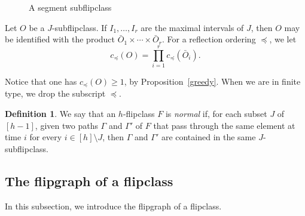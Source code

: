 \documentclass[12pt,reqno]{amsart}
\theoremstyle{plain}
\theoremstyle{definition}
\newtheorem{defn}[thm]{Definition}
\theoremstyle{remark}
\begin{document}
\begin{figure}[ht]
\centering

\caption{A segment subflipclass}
\label{notte}
\end{figure}



Let $O$ be a $J$-subflipclass. If $I_1,\ldots,I_r$ are the maximal intervals of $J$, then $O$ may be identified with 
the product $\bar{O}_1 \times \cdots \times \bar{O}_r$.
For a reflection ordering $\preceq$, we let 
$$c_{\preceq}(O)= \prod_{i=1}^{r} c_{\preceq}(\bar{O}_i).$$

Notice that one has $c_{\preceq}(O) \geq 1$, by Proposition~\ref{greedy}. When we are in finite type, we drop the subscript $\preceq$.



\begin{defn}
We say that an $h$-flipclass $F$ is \emph{normal} if, for each subset $J$ of $[h-1]$, given two paths $\Gamma$ and $\Gamma'$ of $F$ that pass through the same element at time $i$ for every $i\in [h]\setminus J$, then $\Gamma$ and $\Gamma'$ are contained in the same $J$-subflipclass.
\end{defn}

\subsection{The flipgraph of a flipclass}
In this subsection, we introduce the flipgraph of a flipclass.
\end{document}

